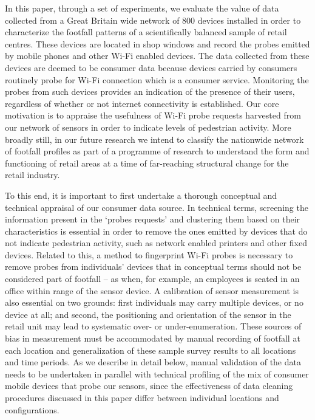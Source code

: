 In this paper, through a set of experiments, we evaluate the value of data
collected from a Great Britain wide network of 800 devices \citep{sss2016}
installed in order to characterize the footfall patterns of a scientifically
balanced sample of retail centres.  These devices are located in shop windows
and record the probes emitted by mobile phones and other Wi-Fi enabled devices.
The data collected from these devices are deemed to be consumer data because
devices carried by consumers routinely probe for Wi-Fi connection which is a
consumer service.  Monitoring the probes from such devices provides an
indication of the presence of their users, regardless of whether or not internet
connectivity is established.  Our core motivation is to appraise the usefulness
of Wi-Fi probe requests harvested from our network of sensors in order to
indicate levels of pedestrian activity.  More broadly still, in our future
research we intend to classify the nationwide network of footfall profiles as
part of a programme of research to understand the form and functioning of retail
areas at a time of far-reaching structural change for the retail industry.

To this end, it is important to first undertake a thorough conceptual and
technical appraisal of our consumer data source.  In technical terms, screening
the information present in the `probes requests' and clustering them based on
their characteristics is essential in order to remove the ones emitted by
devices that do not indicate pedestrian activity, such as network enabled
printers and other fixed devices.  Related to this, a method to fingerprint
Wi-Fi probes is necessary to remove probes from individuals’ devices that in
conceptual terms should not be considered part of footfall – as when, for
example, an employees is seated in an office within range of the sensor device.
A calibration of sensor measurement is also essential on two grounds: first
individuals may carry multiple devices, or no device at all; and second, the
positioning and orientation of the sensor in the retail unit may lead to
systematic over- or under-enumeration.  These sources of bias in measurement
must be accommodated by manual recording of footfall at each location and
generalization of these sample survey results to all locations and time periods.
As we describe in detail below, manual validation of the data needs to be
undertaken in parallel with technical profiling of the mix of consumer mobile
devices that probe our sensors, since the effectiveness of data cleaning
procedures discussed in this paper differ between individual locations and
configurations.
